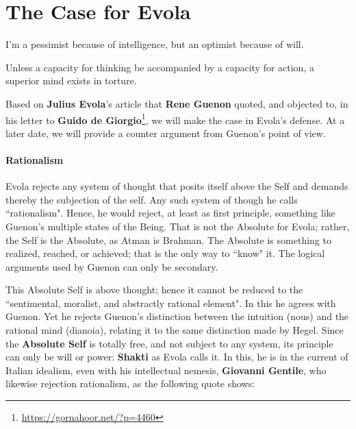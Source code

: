 \section{The Case for Evola}

\begin{quotex}
I'm a pessimist because of intelligence, but an optimist because of will. 

Unless a capacity for thinking be accompanied by a capacity for action, a superior mind exists in torture. 

\end{quotex}
Based on \textbf{Julius Evola}'s article that \textbf{Rene Guenon} quoted, and objected to, in his letter to \textbf{Guido de Giorgio}\footnote{\url{https://gornahoor.net/?p=4460}}, we will make the case in Evola's defense. At a later date, we will provide a counter argument from Guenon's point of view.

\paragraph{Rationalism}
Evola rejects any system of thought that posits itself above the Self and demands thereby the subjection of the self. Any such system of though he calls ``rationalism". Hence, he would reject, at least as first principle, something like Guenon's multiple states of the Being. That is not the Absolute for Evola; rather, the Self is the Absolute, as Atman is Brahman. The Absolute is something to realized, reached, or achieved; that is the only way to ``know" it. The logical arguments used by Guenon can only be secondary.

This Absolute Self is above thought; hence it cannot be reduced to the ``sentimental, moralist, and abstractly rational element". In this he agrees with Guenon. Yet he rejects Guenon's distinction between the intuition (nous) and the rational mind (dianoia), relating it to the same distinction made by Hegel. Since the \textbf{Absolute Self} is totally free, and not subject to any system, its principle can only be will or power: \textbf{Shakti} as Evola calls it. In this, he is in the current of Italian idealism, even with his intellectual nemesis, \textbf{Giovanni Gentile}, who likewise rejection rationalism, as the following quote shows:

